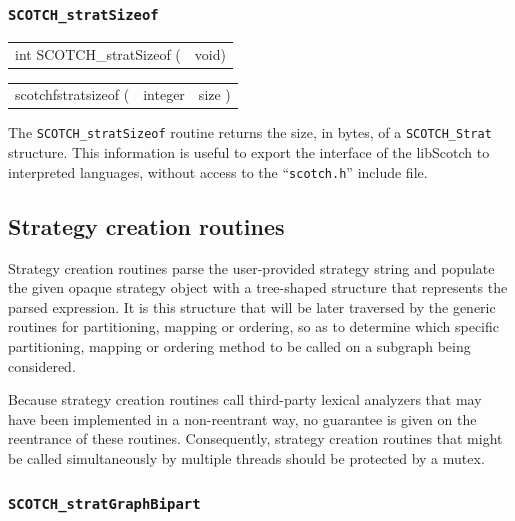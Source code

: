 \subsubsection{{\tt SCOTCH\_stratSizeof}}

\begin{itemize}
\progsyn

{\tt\begin{tabular}{l@{}l}
int SCOTCH\_stratSizeof ( & void)
\end{tabular}}

{\tt\begin{tabular}{l@{}ll}
scotchfstratsizeof ( & integer & size )
\end{tabular}}

\progdes

The {\tt SCOTCH\_stratSizeof} routine returns the size, in bytes, of a
{\tt SCOTCH\_\lbt Strat} structure. This information is useful to
export the interface of the {\sc libScotch} to interpreted languages,
without access to the ``{\tt scotch.h}'' include file.
\end{itemize}

\subsection{Strategy creation routines}
\label{sec-lib-strat-creation}

Strategy creation routines parse the user-provided strategy string and
populate the given opaque strategy object with a tree-shaped structure
that represents the parsed expression. It is this structure that will
be later traversed by the generic routines for partitioning, mapping or
ordering, so as to determine which specific partitioning, mapping or
ordering method to be called on a subgraph being considered.

Because strategy creation routines call third-party lexical analyzers
that may have been implemented in a non-reentrant way, no guarantee is
given on the reentrance of these routines. Consequently, strategy
creation routines that might be called simultaneously by multiple
threads should be protected by a mutex.

\subsubsection{{\tt SCOTCH\_stratGraphBipart}}
\label{sec-lib-strat-graph-bipart}

